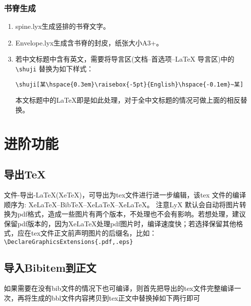 \documentclass[twoside,longtitle]{LZUthesis}
\begin{document}
\subsection{书脊生成}
\begin{enumerate}
\item spine.lyx生成竖排的书脊文字。
\item Envelope.lyx生成含书脊的封皮，纸张大小A3+。
\item 若中文标题中含有英文，需要将导言区(文档--首选项--\LaTeX{} 导言区)中的\lstinline!\shuji! 替换为如下样式：
\small
\begin{verbatim}
\shuji[某\hspace{0.3em}\raisebox{-5pt}{English}\hspace{-0.1em}~某]
\end{verbatim}
\normalsize
本文标题中的\LaTeX{}即是如此处理，对于全中文标题的情况可做上面的相反替换。
\end{enumerate}

\chapter{进阶功能}


\section{导出\protect\TeX{}\label{sec:export}}

文件-导出-\LaTeX{}(Xe\TeX{})，可导出为tex文件进行进一步编辑，该tex 文件的编译顺序为: Xe\LaTeX{}--Bib\TeX{}--Xe\LaTeX{}--Xe\LaTeX{}。 注意LyX 默认会自动将图片转换为pdf格式，造成一些图片有两个版本，不处理也不会有影响。若想处理，建议保留pdf版本的，因为Xe\LaTeX{}处理pdf图片时，编译速度快；若选择保留其他格式，应在tex文件正文前声明图片的后缀名，比如：\lstinline!\DeclareGraphicsExtensions{.pdf,.eps}!


\section{导入Bibitem到正文}

如果需要在没有bib文件的情况下也可编译，则首先把导出的tex文件完整编译一次，再将生成的bbl文件内容拷贝到tex正文中替换掉如下两行即可

\end{document}
